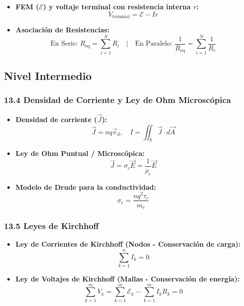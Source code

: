 \documentclass[11pt,a4paper]{article}
\begin{document}
\begin{itemize}
  \item \textbf{FEM ($\mathcal{E}$) y voltaje terminal con resistencia interna $r$:}
  \[
    V_{\text{terminal}} = \mathcal{E} - I r
  \]
  \item \textbf{Asociación de Resistencias:}
  \[
    \text{En Serie: } R_{\text{eq}} = \sum_{i=1}^N R_i \quad | \quad \text{En Paralelo: } \frac{1}{R_{\text{eq}}} = \sum_{i=1}^N \frac{1}{R_i}
  \]
\end{itemize}

\subsection*{Nivel Intermedio}

\subsubsection*{13.4 Densidad de Corriente y Ley de Ohm Microscópica}

\begin{itemize}
  \item \textbf{Densidad de corriente ($\vec{J}$):}
  \[
    \vec{J} = n q \vec{v}_d, \quad I = \iint_S \vec{J} \cdot d\vec{A}
  \]
  \item \textbf{Ley de Ohm Puntual / Microscópica:}
  \[
    \vec{J} = \sigma_c \vec{E} = \frac{1}{\rho_e} \vec{E}
  \]
  \item \textbf{Modelo de Drude para la conductividad:}
  \[
    \sigma_c = \frac{n q^2 \tau_c}{m_e}
  \]
\end{itemize}

\subsubsection*{13.5 Leyes de Kirchhoff}

\begin{itemize}
  \item \textbf{Ley de Corrientes de Kirchhoff (Nodos - Conservación de carga):}
  \[
    \sum_{k=1}^n I_k = 0
  \]
  \item \textbf{Ley de Voltajes de Kirchhoff (Mallas - Conservación de energía):}
  \[
    \sum_{k=1}^m V_k = \sum_{k=1}^m \mathcal{E}_k - \sum_{k=1}^m I_k R_k = 0
  \]
\end{itemize}
\end{document}
